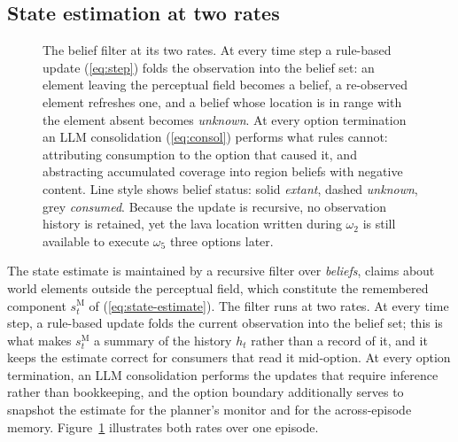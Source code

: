\documentclass[11pt]{article}
\newcommand{\sM}{s^{\mathrm{M}}}
\begin{document}
\subsection{State estimation at two rates}
\label{sec:type1-est}
\begin{figure}[t]
\centering

\caption{The belief filter at its two rates. At every time step a rule-based update (\ref{eq:step}) folds the observation into the belief set: an element leaving the perceptual field becomes a belief, a re-observed element refreshes one, and a belief whose location is in range with the element absent becomes \emph{unknown}. At every option termination an LLM consolidation (\ref{eq:consol}) performs what rules cannot: attributing consumption to the option that caused it, and abstracting accumulated coverage into region beliefs with negative content. Line style shows belief status: solid \emph{extant}, dashed \emph{unknown}, grey \emph{consumed}. Because the update is recursive, no observation history is retained, yet the lava location written during $\omega_2$ is still available to execute $\omega_5$ three options later.}
\label{fig:estimation}
\end{figure}


The state estimate is maintained by a recursive filter over \emph{beliefs}, claims about world elements outside the perceptual field, which constitute the remembered component $\sM_t$ of (\ref{eq:state-estimate}). The filter runs at two rates. At every time step, a rule-based update folds the current observation into the belief set; this is what makes $\sM_t$ a summary of the history $h_t$ rather than a record of it, and it keeps the estimate correct for consumers that read it mid-option. At every option termination, an LLM consolidation performs the updates that require inference rather than bookkeeping, and the option boundary additionally serves to snapshot the estimate for the planner's monitor and for the across-episode memory. Figure~\ref{fig:estimation} illustrates both rates over one episode.
\end{document}

